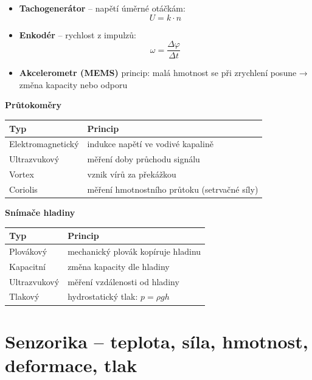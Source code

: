 \documentclass[a4paper,10pt]{article}
\begin{document}
\begin{vysvetlenibox}
\begin{itemize}
\item \textbf{Tachogenerátor} – napětí úměrné otáčkám:
\[
U = k \cdot n
\]

\item \textbf{Enkodér} – rychlost z impulzů:
\[
\omega = \frac{\Delta \varphi}{\Delta t}
\]

\item \textbf{Akcelerometr (MEMS)}
princip: malá hmotnost se při zrychlení posune → změna kapacity nebo odporu
\end{itemize}

\textbf{Průtokoměry}

\begin{tabularx}{\linewidth}{l X}
\toprule
Typ & Princip \\
\midrule
Elektromagnetický & indukce napětí ve vodivé kapalině \\
Ultrazvukový & měření doby průchodu signálu \\
Vortex & vznik vírů za překážkou \\
Coriolis & měření hmotnostního průtoku (setrvačné síly) \\
\bottomrule
\end{tabularx}

\textbf{Snímače hladiny}

\begin{tabularx}{\linewidth}{l X}
\toprule
Typ & Princip \\
\midrule
Plovákový & mechanický plovák kopíruje hladinu \\
Kapacitní & změna kapacity dle hladiny \\
Ultrazvukový & měření vzdálenosti od hladiny \\
Tlakový & hydrostatický tlak: $p = \rho g h$ \\
\bottomrule
\end{tabularx}

\end{vysvetlenibox}



\newpage


\section{Senzorika -- teplota, síla, hmotnost, deformace, tlak}
\end{document}

